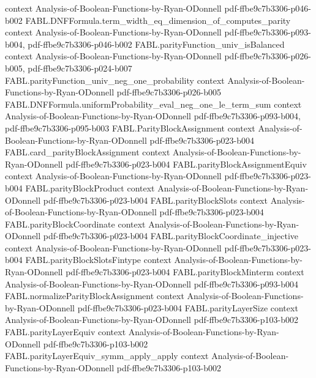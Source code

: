 \begin{theorem}
  {context}
  {Analysis-of-Boolean-Functions-by-Ryan-ODonnell}
  {pdf-ffbe9c7b3306-p046-b002}
\proofstep
  {FABL.DNFFormula.term_width_eq_dimension_of_computes_parity}
  {context}
  {Analysis-of-Boolean-Functions-by-Ryan-ODonnell}
  {pdf-ffbe9c7b3306-p093-b004,
    pdf-ffbe9c7b3306-p046-b002}
\proofstep
  {FABL.parityFunction_univ_isBalanced}
  {context}
  {Analysis-of-Boolean-Functions-by-Ryan-ODonnell}
  {pdf-ffbe9c7b3306-p026-b005,
    pdf-ffbe9c7b3306-p024-b007}
\proofstep
  {FABL.parityFunction_univ_neg_one_probability}
  {context}
  {Analysis-of-Boolean-Functions-by-Ryan-ODonnell}
  {pdf-ffbe9c7b3306-p026-b005}
\proofstep
  {FABL.DNFFormula.uniformProbability_eval_neg_one_le_term_sum}
  {context}
  {Analysis-of-Boolean-Functions-by-Ryan-ODonnell}
  {pdf-ffbe9c7b3306-p093-b004,
    pdf-ffbe9c7b3306-p095-b003}
\proofstep
  {FABL.ParityBlockAssignment}
  {context}
  {Analysis-of-Boolean-Functions-by-Ryan-ODonnell}
  {pdf-ffbe9c7b3306-p023-b004}
\proofstep
  {FABL.card_parityBlockAssignment}
  {context}
  {Analysis-of-Boolean-Functions-by-Ryan-ODonnell}
  {pdf-ffbe9c7b3306-p023-b004}
\proofstep
  {FABL.parityBlockAssignmentEquiv}
  {context}
  {Analysis-of-Boolean-Functions-by-Ryan-ODonnell}
  {pdf-ffbe9c7b3306-p023-b004}
\proofstep
  {FABL.parityBlockProduct}
  {context}
  {Analysis-of-Boolean-Functions-by-Ryan-ODonnell}
  {pdf-ffbe9c7b3306-p023-b004}
\proofstep
  {FABL.parityBlockSlots}
  {context}
  {Analysis-of-Boolean-Functions-by-Ryan-ODonnell}
  {pdf-ffbe9c7b3306-p023-b004}
\proofstep
  {FABL.parityBlockCoordinate}
  {context}
  {Analysis-of-Boolean-Functions-by-Ryan-ODonnell}
  {pdf-ffbe9c7b3306-p023-b004}
\proofstep
  {FABL.parityBlockCoordinate_injective}
  {context}
  {Analysis-of-Boolean-Functions-by-Ryan-ODonnell}
  {pdf-ffbe9c7b3306-p023-b004}
\proofstep
  {FABL.parityBlockSlotsFintype}
  {context}
  {Analysis-of-Boolean-Functions-by-Ryan-ODonnell}
  {pdf-ffbe9c7b3306-p023-b004}
\proofstep
  {FABL.parityBlockMinterm}
  {context}
  {Analysis-of-Boolean-Functions-by-Ryan-ODonnell}
  {pdf-ffbe9c7b3306-p093-b004}
\proofstep
  {FABL.normalizeParityBlockAssignment}
  {context}
  {Analysis-of-Boolean-Functions-by-Ryan-ODonnell}
  {pdf-ffbe9c7b3306-p023-b004}
\proofstep
  {FABL.parityLayerSize}
  {context}
  {Analysis-of-Boolean-Functions-by-Ryan-ODonnell}
  {pdf-ffbe9c7b3306-p103-b002}
\proofstep
  {FABL.parityLayerEquiv}
  {context}
  {Analysis-of-Boolean-Functions-by-Ryan-ODonnell}
  {pdf-ffbe9c7b3306-p103-b002}
\proofstep
  {FABL.parityLayerEquiv_symm_apply_apply}
  {context}
  {Analysis-of-Boolean-Functions-by-Ryan-ODonnell}
  {pdf-ffbe9c7b3306-p103-b002}

\end{theorem}
